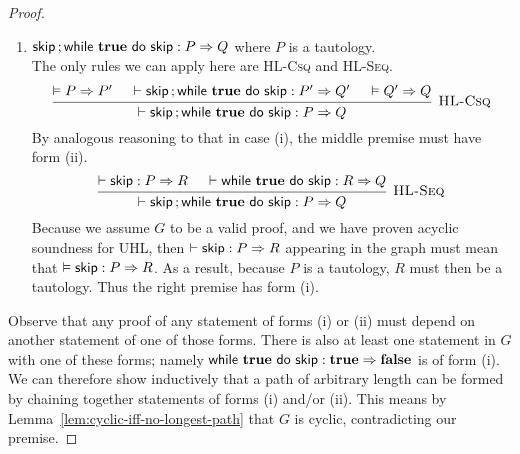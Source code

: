 \begin{proof}
\begin{enumerate}[label=(\roman*)]
\item $\Triple {\Seq \Skip ; {\While {\True} do {\Skip}} } : P => Q$ where $P$ is a tautology. \\
    The only rules we can apply here are \textsc{HL-Csq} and \textsc{HL-Seq}.
%
    \[\begin{prooftree}
        \hypo{\VAL P \Rightarrow P'}
        \hypo{\DER \Triple {\Seq \Skip ; {\While {\True} do {\Skip}} } : P' => Q'}
        \hypo{\VAL Q' \Rightarrow Q}
        \infer3[\textsc{HL-Csq}] 
            {\DER \Triple {\Seq \Skip ; {\While {\True} do {\Skip}} } : P => Q}
    \end{prooftree}\]
%
    By analogous reasoning to that in case (i),
    the middle premise must have form (ii).
    \[\begin{prooftree}
        \hypo{\DER \Triple \Skip : P => R}
        \hypo{\DER \Triple {\While {\True} do {\Skip} } : R => Q}
        \infer2[\textsc{HL-Seq}] 
            {\DER \Triple {\Seq \Skip ; {\While {\True} do {\Skip}} } : P => Q}
    \end{prooftree}\]
%
    Because we assume $G$ to be a valid proof,
    and we have proven acyclic soundness for UHL,
    then $\DER \Triple \Skip : P => R$ appearing in the graph
    must mean that $\VAL \Triple \Skip : P => R$.
    As a result, because $P$ is a tautology, $R$ must then be a tautology.
    Thus the right premise has form (i).
    
\end{enumerate}

Observe that any proof of any statement of forms (i) or (ii)
must depend on another statement of one of those forms.
There is also at least one statement in $G$ with one of these forms;
namely 
$\Triple {\While {\True} do {\Skip} } : \True => \False$ is of form (i).
%
We can therefore show inductively that a path of arbitrary length
can be formed by chaining together statements of forms (i) and/or (ii).
This means by Lemma~\ref{lem:cyclic-iff-no-longest-path} that $G$ is cyclic, contradicting our premise.


\end{proof}

